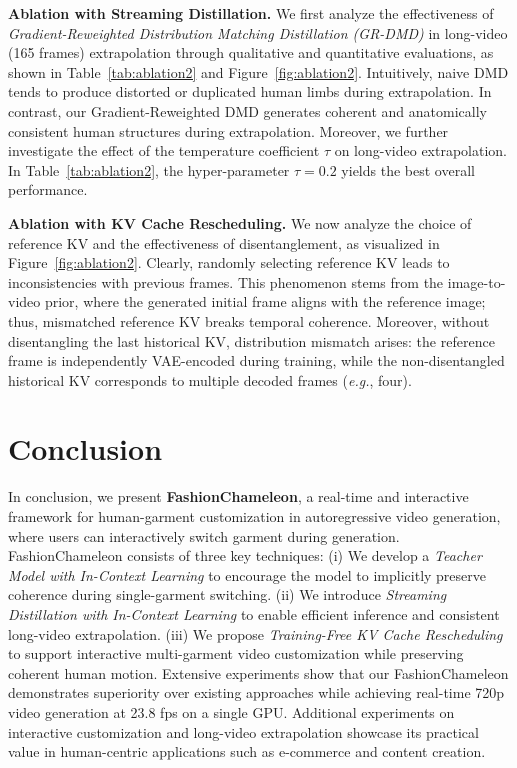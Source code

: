 \documentclass{llmxive}
\providecommand{\method}{FashionChameleon\xspace}
\begin{document}
\noindent
\textbf{Ablation with Streaming Distillation.}
% 
We first analyze the effectiveness of \textit{Gradient-Reweighted Distribution Matching Distillation (GR-DMD)} in long-video (165 frames) extrapolation through qualitative and quantitative evaluations, as shown in Table~\ref{tab:ablation2} and Figure~\ref{fig:ablation2}.
% 
Intuitively, naive DMD tends to produce distorted or duplicated human limbs during extrapolation.
% 
In contrast, our Gradient-Reweighted DMD generates coherent and anatomically consistent human structures during extrapolation.
% 
Moreover, we further investigate the effect of the temperature coefficient $\tau$ on long-video extrapolation.
% 
In Table~\ref{tab:ablation2}, the hyper-parameter $\tau=0.2$ yields the best overall performance.



\noindent
\textbf{Ablation with KV Cache Rescheduling.}
% 
We now analyze the choice of reference KV and the effectiveness of disentanglement, as visualized in Figure~\ref{fig:ablation2}.
% 
Clearly, randomly selecting reference KV leads to inconsistencies with previous frames.
This phenomenon stems from the image-to-video prior, where the generated initial frame aligns with the reference image; thus, mismatched reference KV breaks temporal coherence.
% 
Moreover, without disentangling the last historical KV, distribution mismatch arises: the reference frame is independently VAE-encoded during training, while the non-disentangled historical KV corresponds to multiple decoded frames (\emph{e.g.}, four).

\section{Conclusion}
%
In conclusion, we present \textbf{\method}, a real-time and interactive framework for human-garment customization in autoregressive video generation, where users can interactively switch garment during generation.
% 
\method consists of three key techniques:
% 
(i) We develop a \textit{Teacher Model with In-Context Learning}  to encourage the model to implicitly preserve coherence during single-garment switching.
(ii) We introduce \textit{Streaming Distillation with In-Context Learning} to enable efficient inference and consistent long-video extrapolation.
(iii) We propose \textit{Training-Free KV Cache Rescheduling} to support interactive multi-garment video customization while preserving coherent human motion.
% 
Extensive experiments show that our \method demonstrates superiority over existing approaches while achieving real-time 720p video generation at 23.8 fps on a single GPU. 
Additional experiments on interactive customization and long-video extrapolation showcase its practical value in human-centric applications such as e-commerce and content creation.
\end{document}
